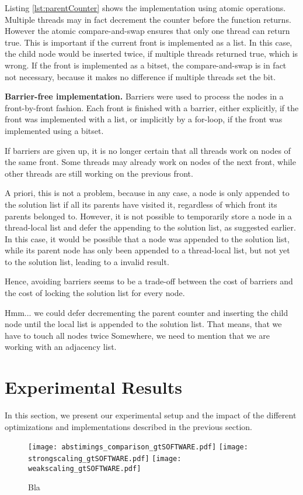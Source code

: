 \documentclass[letterpaper]{article}
\newcommand{\mypar}[1]{{\bf #1.}}
\begin{document}
Listing \ref{lst:parentCounter} shows the implementation using atomic operations. Multiple threads may in fact decrement the counter before the function returns.
However the atomic compare-and-swap ensures that only one thread can return true. This is important if the current front is implemented as a list.
In this case, the child node would be inserted twice, if multiple threads returned true, which is wrong.
If the front is implemented as a bitset, the compare-and-swap is in fact not necessary, because it makes no difference if multiple threads set the bit.

\mypar{Barrier-free implementation}
Barriers were used to process the nodes in a front-by-front fashion.
Each front is finished with a barrier, either explicitly, if the front was implemented with a list, or implicitly by a for-loop, if the front was implemented using a bitset.

If barriers are given up, it is no longer certain that all threads work on nodes of the same front.
Some threads may already work on nodes of the next front, while other threads are still working on the previous front.

A priori, this is not a problem, because in any case, a node is only appended to the solution list if all its parents have visited it, regardless of which front its parents belonged to.
However, it is not possible to temporarily store a node in a thread-local list and defer the appending to the solution list, as suggested earlier.
In this case, it would be possible that a node was appended to the solution list, while its parent node has only been appended to a thread-local list, but not yet to the solution list, leading to a invalid result.

Hence, avoiding barriers seems to be a trade-off between the cost of barriers and the cost of locking the solution list for every node.

\begin{invisible}
Hmm... we could defer decrementing the parent counter and inserting the child node until the local list is appended to the solution list. That means, that we have to touch all nodes twice
Somewhere, we need to mention that we are working with an adjacency list.
\end{invisible}

\section{Experimental Results}\label{sec:exp}
In this section, we present our experimental setup and the impact of the different optimizations and implementations described in the previous section.
\par\medskip
%
\begin{figure}
	\centering
	\texttt{[image: abstimings\_comparison\_gtSOFTWARE.pdf]}
	\texttt{[image: strongscaling\_gtSOFTWARE.pdf]}
	\texttt{[image: weakscaling\_gtSOFTWARE.pdf]}

	\caption{Bla}
	\label{fig:strongscaling_gtsoftware}
\end{figure}
\end{document}
